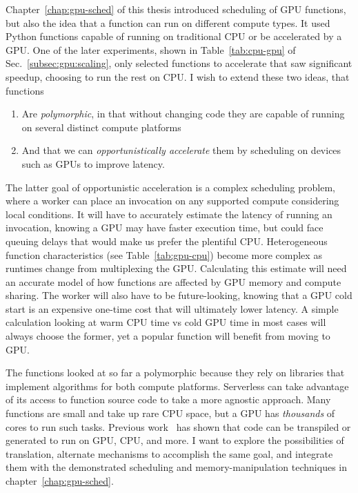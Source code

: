Chapter~\ref{chap:gpu-sched} of this thesis introduced scheduling of GPU functions, but also the idea that a function can run on different compute types.
It used Python functions capable of running on traditional CPU or be accelerated by a GPU.
One of the later experiments, shown in Table~\ref{tab:cpu-gpu} of Sec.~\ref{subsec:gpu:scaling}, only selected functions to accelerate that saw significant speedup, choosing to run the rest on CPU.
I wish to extend these two ideas, that functions
\begin{enumerate}
  \item Are \emph{polymorphic}, in that without changing code they are capable of running on several distinct compute platforms
  \item And that we can \emph{opportunistically accelerate} them by scheduling on devices such as GPUs to improve latency.
\end{enumerate}

The latter goal of opportunistic acceleration is a complex scheduling problem, where a worker can place an invocation on any supported compute considering local conditions.
It will have to accurately estimate the latency of running an invocation, knowing a GPU may have faster execution time, but could face queuing delays that would make us prefer the plentiful CPU.
Heterogeneous function characteristics (see Table~\ref{tab:gpu-cpu}) become more complex as runtimes change from multiplexing the GPU.
Calculating this estimate will need an accurate model of how functions are affected by GPU memory and compute sharing.
The worker will also have to be future-looking, knowing that a GPU cold start is an expensive one-time cost that will ultimately lower latency.
A simple calculation looking at warm CPU time vs cold GPU time in most cases will always choose the former, yet a popular function will benefit from moving to GPU.

The functions looked at so far a polymorphic because they rely on libraries that implement algorithms for both compute platforms.
Serverless can take advantage of its access to function source code to take a more agnostic approach.
Many functions are small and take up rare CPU space, but a GPU has \emph{thousands} of cores to run such tasks.
Previous work~\cite{ginzburg2023vectorvisor,baghdadi2019tiramisu,gpu-to-cpu} has shown that code can be transpiled or generated to run on GPU, CPU, and more.
I want to explore the possibilities of translation, alternate mechanisms to accomplish the same goal, and integrate them with the demonstrated scheduling and memory-manipulation techniques in chapter~\ref{chap:gpu-sched}.

